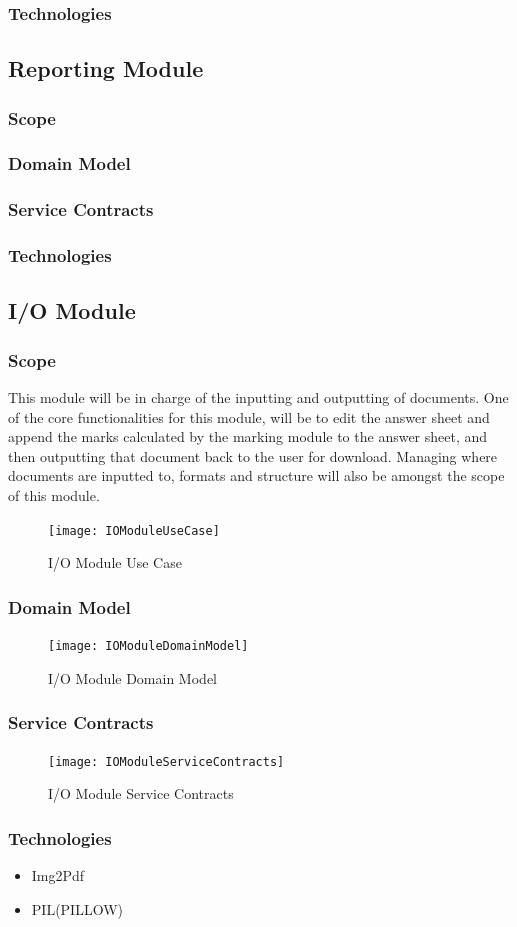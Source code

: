 \documentclass{article}
\begin{document}
		\subsubsection{Technologies}
		
	\subsection{Reporting Module}
		\subsubsection{Scope}
		\subsubsection{Domain Model}
		\subsubsection{Service Contracts}
		\subsubsection{Technologies}
		
	\subsection{I/O Module}
		\subsubsection{Scope}
				This module will be in charge of the inputting and outputting of documents. One of the core functionalities
		for this module, will be to edit the answer sheet and append the marks calculated by the marking module
		to the answer sheet, and then outputting that document back to the user for download. Managing where
		documents are inputted to, formats and structure will also be amongst the scope of this module.
		
				\begin{figure}[h]
			\texttt{[image: IOModuleUseCase]}
			\caption{I/O Module Use Case}
		\end{figure}
		
		\subsubsection{Domain Model}
					\begin{figure}[h]
				\texttt{[image: IOModuleDomainModel]}
				\caption{I/O Module Domain Model}
			\end{figure}
			
		\subsubsection{Service Contracts}
					\begin{figure}[h]
				\texttt{[image: IOModuleServiceContracts]}
				\caption{I/O Module Service Contracts}
			\end{figure}
			
		\subsubsection{Technologies}
					\begin{itemize}
				\item Img2Pdf
				\item PIL(PILLOW)
			\end{itemize}
		
\end{document}
